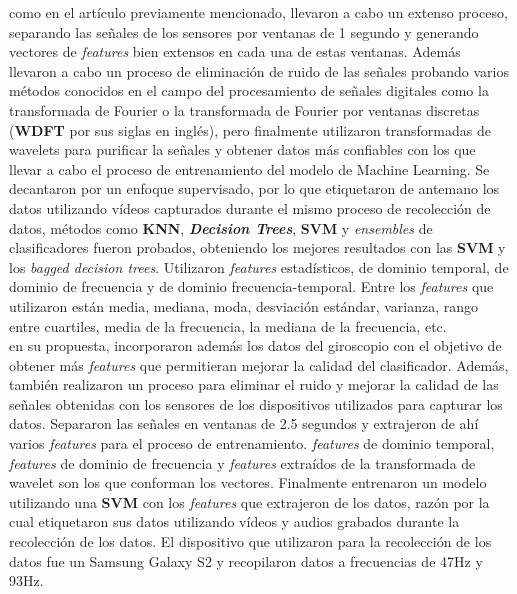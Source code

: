 \cite{el2018towards} como en el artículo previamente mencionado, llevaron a cabo un extenso proceso, separando las señales de los sensores por
ventanas de 1 segundo y generando vectores de \emph{features} bien extensos en cada una de estas ventanas. Además llevaron a cabo un proceso de eliminación de ruido
de las señales probando varios métodos conocidos en el campo del procesamiento de señales digitales como la transformada de Fourier o la transformada de
Fourier por ventanas discretas (\textbf{WDFT} por sus siglas en inglés), pero finalmente utilizaron transformadas de wavelets para purificar la señales y obtener
datos más confiables con los que llevar a cabo el proceso de entrenamiento del modelo de Machine Learning. Se decantaron por un enfoque supervisado, por lo que
etiquetaron de antemano los datos utilizando vídeos capturados durante el mismo proceso de recolección de datos, métodos como \textbf{KNN},
\emph{\textbf{Decision Trees}}, \textbf{SVM} y \emph{ensembles} de clasificadores fueron probados, obteniendo los mejores resultados con las \textbf{SVM} y los
\emph{bagged decision trees}. Utilizaron \emph{features} estadísticos, de dominio temporal, de dominio de frecuencia y de dominio frecuencia-temporal. Entre los
\emph{features} que utilizaron están media, mediana, moda, desviación estándar, varianza, rango entre cuartiles, media de la frecuencia, la mediana de la frecuencia,
etc.\\

\cite{seraj2015roads} en su propuesta, incorporaron además los datos del giroscopio con el objetivo de obtener más \emph{features} que permitieran mejorar la calidad
del clasificador. Además, también realizaron un proceso para eliminar el ruido y mejorar la calidad de las señales obtenidas con los sensores de los dispositivos
utilizados para capturar los datos. Separaron las señales en ventanas de 2.5 segundos y extrajeron de ahí varios \emph{features} para el proceso de entrenamiento.
\emph{features} de dominio temporal, \emph{features} de dominio de frecuencia y \emph{features} extraídos de la transformada de wavelet son los que conforman los vectores.
Finalmente entrenaron un modelo utilizando una \textbf{SVM} con los \emph{features} que extrajeron de los datos, razón por la cual etiquetaron sus datos utilizando vídeos
y audios grabados durante la recolección de los datos. El dispositivo que utilizaron para la recolección de los datos fue un Samsung Galaxy S2 y recopilaron datos a
frecuencias de 47Hz y 93Hz.\\


